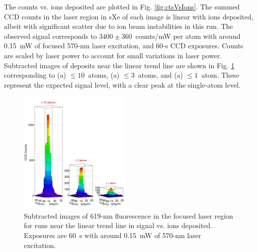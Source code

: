 \documentclass[aps,pra,reprint,superscriptaddress]{revtex4-1}
\begin{document}
The counts vs. ions deposited are plotted in Fig. \ref{fig:ctsVsIons}.  The summed CCD counts in the laser region in sXe of each image is linear with ions deposited, albeit with significant scatter due to ion beam instabilities in this run.  The observed signal corresponds to $3400 \pm 360$~counts/mW per atom with around 0.15~mW of focused 570-nm laser excitation, and 60-s CCD exposures.  Counts are scaled by laser power to account for small variations in laser power.  Subtracted images of deposits near the linear trend line are shown in Fig. \ref{fig:train} corresponding to (a) $\leq 10$~atoms, (a) $\leq 3$~atoms, and (a) $\leq 1$~atom.  These represent the expected signal level, with a clear peak at the single-atom level.



\begin{figure}
\includegraphics[width=0.48\textwidth]{figures/lego_train_fromthesis.png}
\caption{Subtracted images of 619-nm fluorescence in the focused laser region for runs near the linear trend line in signal vs. ions deposited.  Exposures are 60~s with around 0.15~mW of 570-nm laser excitation.}
\label{fig:train}
\end{figure}
\end{document}
